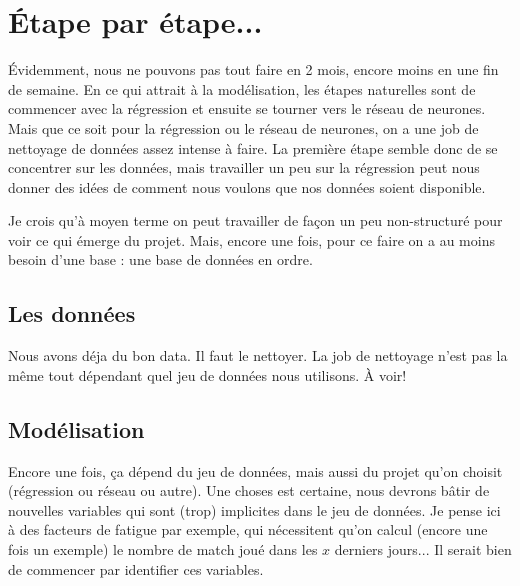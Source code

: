 \documentclass[12pt]{article}
\begin{document}
\newpage
\section{Étape par étape...}
Évidemment, nous ne pouvons pas tout faire en 2 mois, encore moins en une fin de semaine. En ce qui attrait à la modélisation, les étapes naturelles sont de commencer avec la régression et ensuite se tourner vers le réseau de neurones. Mais que ce soit pour la régression ou le réseau de neurones, on a une job de nettoyage de données assez intense à faire. La première étape semble donc de se concentrer sur les données, mais travailler un peu sur la régression peut nous donner des idées de comment nous voulons que nos données soient disponible.

Je crois qu'à moyen terme on peut travailler de façon un peu non-structuré pour voir ce qui émerge du projet. Mais, encore une fois, pour ce faire on a au moins besoin d'une base : une base de données en ordre.

\subsection{Les données}
Nous avons déja du bon data. Il faut le nettoyer. La job de nettoyage n'est pas la même tout dépendant quel jeu de données nous utilisons. À voir!

\subsection{Modélisation}
Encore une fois, ça dépend du jeu de données, mais aussi du projet qu'on choisit (régression ou réseau ou autre). Une choses est certaine, nous devrons bâtir de nouvelles variables qui sont (trop) implicites dans le jeu de données. Je pense ici à des facteurs de fatigue par exemple, qui nécessitent qu'on calcul (encore une fois un exemple) le nombre de match joué dans les $x$ derniers jours... Il serait bien de commencer par identifier ces variables.


%
%
\end{document}
